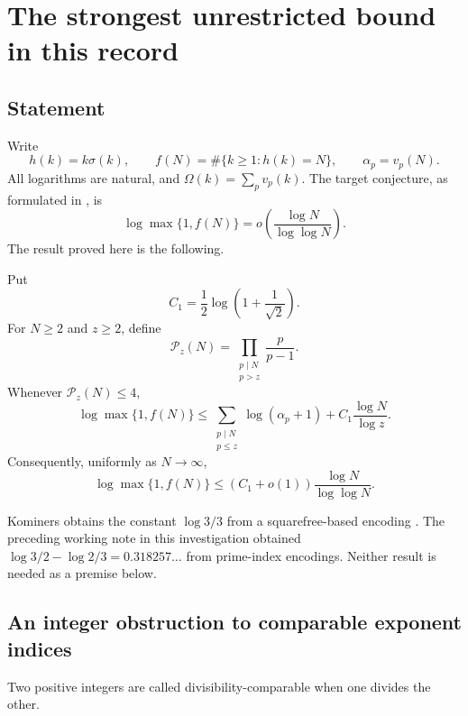 \chapter{The strongest unrestricted bound in this record}\label{ch:chain}
\section{Statement}
Write
\[
h(k)=k\sigma(k),\qquad f(N)=\#\{k\ge1:h(k)=N\},\qquad \alpha_p=v_p(N).
\]
All logarithms are natural, and $\Omega(k)=\sum_p v_p(k)$. The target conjecture, as formulated in \cite{kominers}, is
\[
\log\max\{1,f(N)\}=o\!\left(\frac{\log N}{\log\log N}\right).
\]
The result proved here is the following.

\begin{theorem}\label{chain:thm:main}
Put
\[
C_1=\frac12\log\left(1+\frac1{\sqrt2}\right).
\]
For $N\ge2$ and $z\ge2$, define
\[
\mathcal P_z(N)=\prod_{\substack{p\mid N\\p>z}}\frac{p}{p-1}.
\]
Whenever $\mathcal P_z(N)\le4$,
\begin{equation}\label{chain:eq:finite}
\boxed{\log\max\{1,f(N)\}\le
\sum_{\substack{p\mid N\\p\le z}}\log(\alpha_p+1)
+C_1\frac{\log N}{\log z}.}
\end{equation}
Consequently, uniformly as $N\to\infty$,
\begin{equation}\label{chain:eq:asymptotic}
\boxed{\log\max\{1,f(N)\}\le
(C_1+o(1))\frac{\log N}{\log\log N}.}
\end{equation}
\end{theorem}
Kominers obtains the constant $\log3/3$ from a squarefree-based encoding \cite{kominers}. The preceding working note in this investigation obtained $\log3/2-\log2/3=0.318257\ldots$ from prime-index encodings. Neither result is needed as a premise below.


\section{An integer obstruction to comparable exponent indices}
Two positive integers are called divisibility-comparable when one divides the other.

